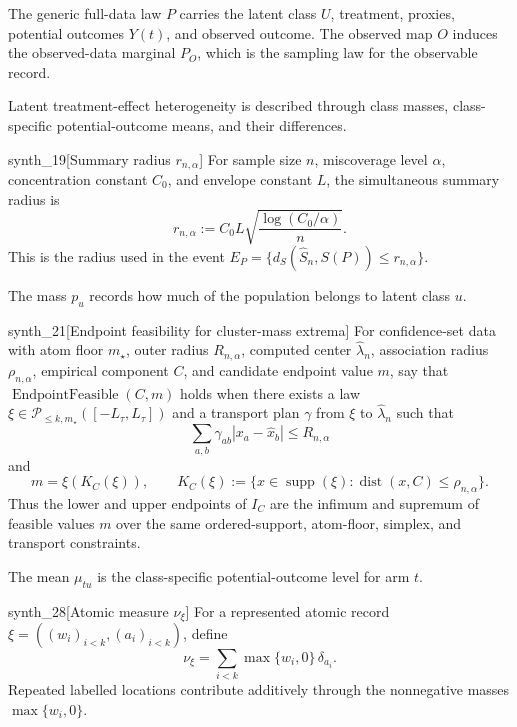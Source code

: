 The generic full-data law \(P\) carries the latent class \(U\), treatment, proxies, potential outcomes \(Y(t)\), and observed outcome. The observed map \(O\) induces the observed-data marginal \(P_O\), which is the sampling law for the observable record.

Latent treatment-effect heterogeneity is described through class masses, class-specific potential-outcome means, and their differences.

\begin{definitionv}{synth_19}[Summary radius \(r_{n,\alpha}\)]
For sample size \(n\), miscoverage level \(\alpha\), concentration constant \(C_0\), and envelope constant \(L\), the simultaneous summary radius is
\[
r_{n,\alpha}:=C_0L\sqrt{\frac{\log(C_0/\alpha)}{n}}.
\]
This is the radius used in the event \(E_P=\{d_S(\widehat S_n,S(P))\le r_{n,\alpha}\}\).
\end{definitionv}

The mass \(p_u\) records how much of the population belongs to latent class \(u\).

\begin{definitionv}{synth_21}[Endpoint feasibility for cluster-mass extrema]
For confidence-set data with atom floor \(m_\star\), outer radius \(R_{n,\alpha}\), computed center \(\widehat\lambda_n\), association radius \(\rho_{n,\alpha}\), empirical component \(C\), and candidate endpoint value \(m\), say that \(\operatorname{EndpointFeasible}(C,m)\) holds when there exists a law \(\xi\in\mathcal P_{\le k,m_\star}([-L_\tau,L_\tau])\) and a transport plan \(\gamma\) from \(\xi\) to \(\widehat\lambda_n\) such that \[ \sum_{a,b}\gamma_{ab}|x_a-\widehat x_b|\le R_{n,\alpha} \] and \[ m=\xi(K_C(\xi)),\qquad K_C(\xi):=\{x\in\operatorname{supp}(\xi):\operatorname{dist}(x,C)\le\rho_{n,\alpha}\}. \] Thus the lower and upper endpoints of \(I_C\) are the infimum and supremum of feasible values \(m\) over the same ordered-support, atom-floor, simplex, and transport constraints.
\end{definitionv}

The mean \(\mu_{tu}\) is the class-specific potential-outcome level for arm \(t\).

\begin{definitionv}{synth_28}[Atomic measure \(\nu_\xi\)]
For a represented atomic record \(\xi=((w_i)_{i<k},(a_i)_{i<k})\), define
\[
\nu_\xi=\sum_{i<k}\max\{w_i,0\}\,\delta_{a_i}.
\]
Repeated labelled locations contribute additively through the nonnegative masses \(\max\{w_i,0\}\).
\end{definitionv}

